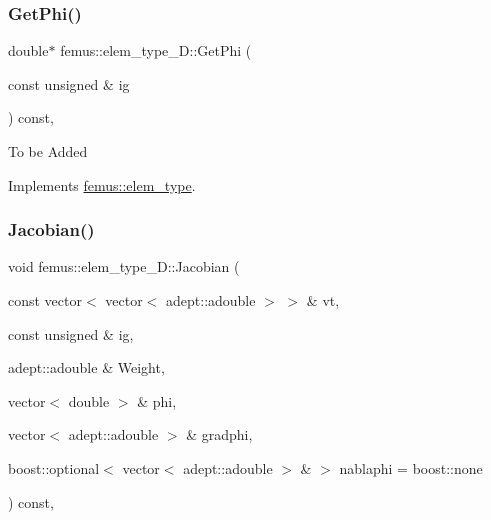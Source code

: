 \mbox{\label{classfemus_1_1elem__type__1_d_ac3bf43aa0c1c02c1113228011462a893}} 
\subsubsection{\texorpdfstring{Get\+Phi()}{GetPhi()}}
{\footnotesize\ttfamily double$\ast$ femus\+::elem\+\_\+type\+\_\+D\+::\+Get\+Phi (\begin{DoxyParamCaption}\item[{const unsigned \&}]{ig }\end{DoxyParamCaption}) const\hspace{0.3cm}{\ttfamily [inline]}, {\ttfamily [virtual]}}

To be Added 

Implements \mbox{\hyperlink{classfemus_1_1elem__type_a2aa2a37b15debbee27918f5e3f2df6b3}{femus\+::elem\+\_\+type}}.

\mbox{\label{classfemus_1_1elem__type__1_d_a4c063f6c2d18fbc305e3bde505c49279}} 
\subsubsection{\texorpdfstring{Jacobian()}{Jacobian()}\hspace{0.1cm}{\footnotesize\ttfamily [1/4]}}
{\footnotesize\ttfamily void femus\+::elem\+\_\+type\+\_\+D\+::\+Jacobian (\begin{DoxyParamCaption}\item[{const vector$<$ vector$<$ adept\+::adouble $>$ $>$ \&}]{vt,  }\item[{const unsigned \&}]{ig,  }\item[{adept\+::adouble \&}]{Weight,  }\item[{vector$<$ double $>$ \&}]{phi,  }\item[{vector$<$ adept\+::adouble $>$ \&}]{gradphi,  }\item[{boost\+::optional$<$ vector$<$ adept\+::adouble $>$ \& $>$}]{nablaphi = {\ttfamily boost\+:\+:none} }\end{DoxyParamCaption}) const\hspace{0.3cm}{\ttfamily [inline]}, {\ttfamily [virtual]}}



